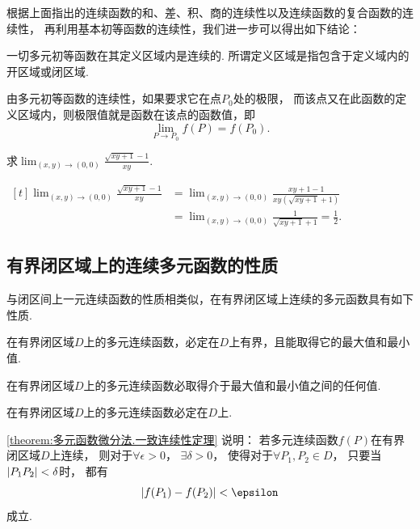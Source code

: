 根据上面指出的连续函数的和、差、积、商的连续性以及连续函数的复合函数的连续性，
再利用基本初等函数的连续性，我们进一步可以得出如下结论：

一切多元初等函数在其定义区域内是连续的.
所谓定义区域是指包含于定义域内的开区域或闭区域.

由多元初等函数的连续性，如果要求它在点\(P_0\)处的极限，
而该点又在此函数的定义区域内，则极限值就是函数在该点的函数值，即\begin{equation*}
	\lim_{P \to P_0} f(P) = f(P_0).
\end{equation*}

\begin{example}
\def\l{\lim_{(x,y)\to(0,0)}}
求\(\l \frac{\sqrt{xy+1}-1}{xy}\).
\begin{solution}
\(\begin{aligned}[t]
\l \frac{\sqrt{xy+1}-1}{xy}
&= \l \frac{xy+1-1}{xy(\sqrt{xy+1}+1)} \\
&= \l \frac{1}{\sqrt{xy+1}+1}
= \frac{1}{2}.
\end{aligned}\)
\end{solution}
\end{example}

\subsection{有界闭区域上的连续多元函数的性质}
与闭区间上一元连续函数的性质相类似，在有界闭区域上连续的多元函数具有如下性质.

\begin{property}[有界性与最值定理]\label{theorem:多元函数微分法.有界性与最值定理}
在有界闭区域\(D\)上的多元连续函数，必定在\(D\)上有界，且能取得它的最大值和最小值.
\end{property}

\begin{property}[介值定理]\label{theorem:多元函数微分法.介值定理}
在有界闭区域\(D\)上的多元连续函数必取得介于最大值和最小值之间的任何值.
\end{property}

\begin{property}[一致连续性定理]\label{theorem:多元函数微分法.一致连续性定理}
在有界闭区域\(D\)上的多元连续函数必定在\(D\)上.
\end{property}
\cref{theorem:多元函数微分法.一致连续性定理} 说明：
若多元连续函数\(f(P)\)在有界闭区域\(D\)上连续，
则对于\(\forall \epsilon > 0\)，
\(\exists \delta > 0\)，
使得对于\(\forall P_1,P_2 \in D\)，
只要当\(\abs{P_1P_2}<\delta\)时，
都有\begin{equation*}
	\abs{f(P_1)-f(P_2)} < \epsilon
\end{equation*}成立.
